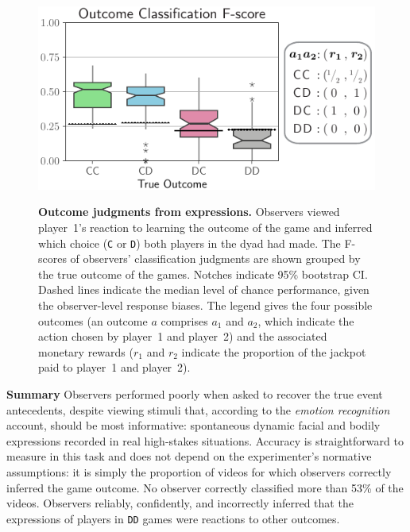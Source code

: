 \documentclass[10pt,letterpaper]{article}
\newcommand{\C}{\texttt{C}\xspace}
\newcommand{\D}{\texttt{D}\xspace}
\newcommand{\DD}{\texttt{DD}\xspace}
\begin{document}
\begin{figure}[tb]
    \centering
    {%
      \includegraphics[width=1.0\columnwidth]{fig/f1comp-cogsci2022.pdf}%
    }
    \caption{
    \textbf{Outcome judgments from expressions.}
    Observers viewed player~1's reaction to learning the outcome of the game and inferred which choice (\C or \D) both players in the dyad had made.
    The F-scores of observers' classification judgments are shown grouped by the true outcome of the games. 
    Notches indicate 95\% bootstrap CI. Dashed lines indicate the median level of chance performance, given the observer-level response biases.
    The legend gives the four possible outcomes (an outcome $a$ comprises $a_1$ and $a_2$, which indicate the action chosen by player~1 and player~2) and the associated monetary rewards ($r_1$ and $r_2$ indicate the proportion of the jackpot paid to player~1 and player~2).
    }
    \label{fig:fscore}
\end{figure}


\vspace{1 mm}
\noindent\textbf{Summary}
Observers performed poorly when asked to recover the true event antecedents, despite viewing stimuli that, according to the {\em emotion recognition} account, should be most informative: spontaneous dynamic facial and bodily expressions recorded in real high-stakes situations. 
Accuracy is straightforward to measure in this task and does not depend on the experimenter's normative assumptions: it is simply the proportion of videos for which observers correctly inferred the game outcome. 
No observer correctly classified more than 53\% of the videos. 
Observers reliably, confidently, and incorrectly inferred that the expressions of players in \DD games were reactions to other outcomes. 
\end{document}
